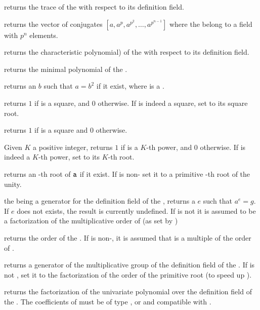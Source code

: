  returns the trace of the   with
respect to its definition field.

 returns the vector of conjugates
$[a,a^p,a^{p^2},\ldots,a^{p^{n-1}}]$ where the   belong to a
field with $p^n$ elements.

 returns the characteristic polynomial) of the
  with respect to its definition field.

 returns the minimal polynomial of
the  .

 returns an  $b$ such that $a=b^2$ if
it exist, where  is a .

 returns $1$ if  is a
square, and $0$ otherwise. If  is indeed a square, set  to its
square root.

 returns $1$ if  is a square and $0$
otherwise.

 Given $K$ a positive integer,
returns $1$ if  is a $K$-th power, and $0$ otherwise. If  is
indeed a $K$-th power, set  to its $K$-th root.

 returns an -th root of
${\tt a}$ if it exist. If  is non- set it to a primitive
-th root of the unity.

 the   being a
generator for the definition field of the  , returns a
 $e$ such that $a^e=g$.  If $e$ does not exists, the result is
currently undefined. If  is not  it is assumed to be a
factorization of the multiplicative order of  (as set by
)

 returns the order of the  .
If  is non-, it is assumed that  is a multiple of the
order of .

 returns a generator of the
multiplicative group of the definition field of the  .
If  is not , set it to the factorization of the order
of the primitive root (to speed up ).

 returns the factorization of the univariate
polynomial  over the definition field of the  . The
coefficients of  must be of type ,  or 
and compatible with .

